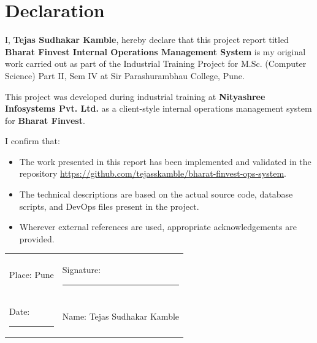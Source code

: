 \chapter*{Declaration}
I, \textbf{Tejas Sudhakar Kamble}, hereby declare that this project report titled \textbf{Bharat Finvest Internal Operations Management System} is my original work carried out as part of the Industrial Training Project for M.Sc. (Computer Science) Part II, Sem IV at Sir Parashurambhau College, Pune.

This project was developed during industrial training at \textbf{Nityashree Infosystems Pvt. Ltd.} as a client-style internal operations management system for \textbf{Bharat Finvest}.

I confirm that:
\begin{itemize}[leftmargin=1.3cm]
\item The work presented in this report has been implemented and validated in the repository \url{https://github.com/tejasskamble/bharat-finvest-ops-system}.
\item The technical descriptions are based on the actual source code, database scripts, and DevOps files present in the project.
\item Wherever external references are used, appropriate acknowledgements are provided.
\end{itemize}

\vspace{1.5cm}
\begin{tabular}{p{8cm}p{6cm}}
Place: Pune & Signature: \rule{3.2cm}{0.4pt} \\
Date: \rule{2.4cm}{0.4pt} & Name: Tejas Sudhakar Kamble
\end{tabular}

